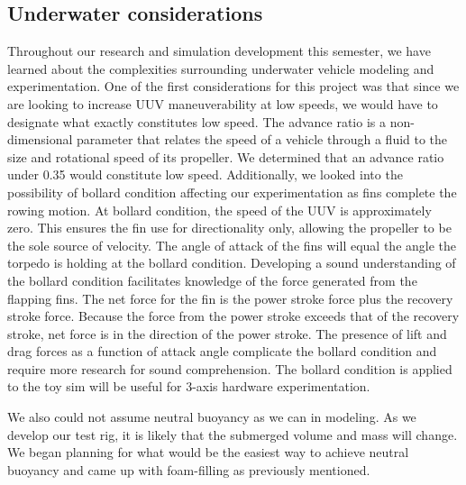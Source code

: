 \documentclass[twocolumn,10pt]{IEEEtran}
\begin{document}
\subsection{Underwater considerations}
Throughout our research and simulation development this semester, we have learned about the complexities surrounding underwater vehicle modeling and experimentation. One of the first considerations for this project was that since we are looking to increase UUV maneuverability at low speeds, we would have to designate what exactly constitutes low speed. The advance ratio is a non-dimensional parameter that relates the speed of a vehicle through a fluid to the size and rotational speed of its propeller. We determined that an advance ratio under 0.35 would constitute low speed. Additionally, we looked into the possibility of bollard condition affecting our experimentation as fins complete the rowing motion.  At bollard condition, the speed of the UUV is approximately zero.  This ensures the fin use for directionality only, allowing the propeller to be the sole source of velocity.  The angle of attack of the fins will equal the angle the torpedo is holding at the bollard condition.  Developing a sound understanding of the bollard condition facilitates knowledge of the force generated from the flapping fins.  The net force for the fin is the power stroke force plus the recovery stroke force.  Because the force from the power stroke exceeds that of the recovery stroke, net force is in the direction of the power stroke.  The presence of lift and drag forces as a function of attack angle complicate the bollard condition and require more research for sound comprehension.  The bollard condition is applied to the toy sim will be useful for 3-axis hardware experimentation. 

We also could not assume neutral buoyancy as we can in modeling. As we develop our test rig, it is likely that the submerged volume and mass will change. We began planning for what would be the easiest way to achieve neutral buoyancy and came up with foam-filling as previously mentioned. 
\end{document}
